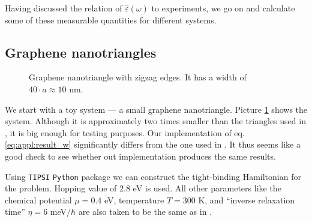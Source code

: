 \documentclass[a4paper,12pt]{article}
\begin{document}
    Having discussed the relation of $\hat\varepsilon(\omega)$ to experiments, we go on and calculate some of these measurable quantities for different systems.

\newpage
\subsection{Graphene nanotriangles}
    \begin{figure}
        \center
        \vspace{-1.5cm}
        
        \captionsetup{width=0.5\textwidth}
        \caption{Graphene nanotriangle with zigzag edges. It has a width of $40\cdot a \approx 10$ nm.}
        \label{fig:coordinates-ZigZag-40}
    \end{figure}
    We start with a toy system --- a small graphene nanotriangle. Picture \ref{fig:coordinates-ZigZag-40} shows the system. Although it is approximately two times smaller than the triangles used in \cite{plasmonic2015}, it is big enough for testing purposes. Our implementation of eq. \eqref{eq:appl:result_w} significantly differs from the one used in \cite{plasmonic2015}. It thus seems like a good check to see whether out implementation produces the same results. 

    Using \texttt{TIPSI} \texttt{Python} package we can construct the tight-binding Hamiltonian for the problem. Hopping value of $2.8$ eV is used. All other parameters like the chemical potential $\mu = 0.4$ eV, temperature $T = 300$ K, and ``inverse relaxation time'' $\eta = 6$ meV$\!/\hbar$ are also taken to be the same as in \cite{plasmonic2015}.

    \begin{figure}[h]
    \begin{minipage}{\textwidth}
        
        \label{fig:spectrum-ZigZag-40}
    \end{minipage}
    \begin{minipage}{\textwidth}
        \vspace{-1.0cm}
        
        \label{fig:eigenmodes-ZigZag-40}
    \end{minipage}
    \end{figure}
\end{document}
